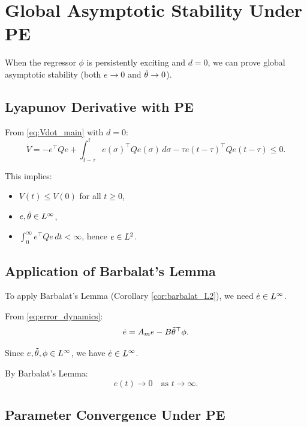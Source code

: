 \section{Global Asymptotic Stability Under PE}

When the regressor $\phi$ is persistently exciting and $d = 0$, we can prove global asymptotic stability (both $e \to 0$ and $\tilde{\theta} \to 0$).

\subsection{Lyapunov Derivative with PE}

From \eqref{eq:Vdot_main} with $d = 0$:
\begin{equation}
    \dot{V} = -e^\top Q e + \int_{t-\tau}^t e(\sigma)^\top Q e(\sigma) \, d\sigma - \tau e(t-\tau)^\top Q e(t-\tau) \leq 0.
\end{equation}

This implies:
\begin{itemize}
    \item $V(t) \leq V(0)$ for all $t \geq 0$,
    \item $e, \tilde{\theta} \in L^{\infty}$,
    \item $\int_0^\infty e^\top Q e \, dt < \infty$, hence $e \in L^{2}$.
\end{itemize}

\subsection{Application of Barbalat's Lemma}

To apply Barbalat's Lemma (Corollary \ref{cor:barbalat_L2}), we need $\dot{e} \in L^{\infty}$.

From \eqref{eq:error_dynamics}:
\begin{equation}
    \dot{e} = A_m e - B \tilde{\theta}^\top \phi.
\end{equation}

Since $e, \tilde{\theta}, \phi \in L^{\infty}$, we have $\dot{e} \in L^{\infty}$.

By Barbalat's Lemma:
\begin{equation}
    \boxed{e(t) \to 0 \quad \text{as } t \to \infty.}
\end{equation}

\subsection{Parameter Convergence Under PE}

